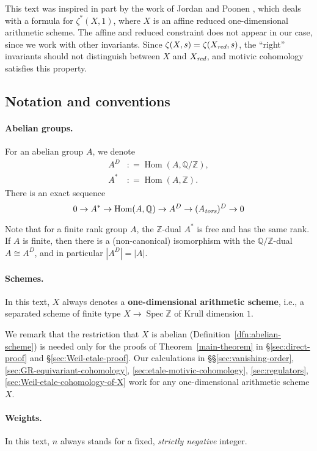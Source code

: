 \documentclass[draft]{article}
\DeclareMathOperator{\Hom}{Hom}
\DeclareMathOperator{\Spec}{Spec}
\newcommand{\QQ}{\mathbb{Q}}
\newcommand{\ZZ}{\mathbb{Z}}
\newcommand{\red}{\text{\it red}}
\newcommand{\tors}{\text{\it tors}}
\newcommand{\dfn}{\mathrel{\mathop:}=}
\theoremstyle{myplain}
\theoremstyle{mydefinition}
\begin{document}
This text was inspired in part by the work of Jordan and Poonen
\cite{Jordan-Poonen-2020}, which deals with a formula for $\zeta^* (X,1)$, where
$X$ is an affine reduced one-dimensional arithmetic scheme. The affine and
reduced constraint does not appear in our case, since we work with other
invariants. Since $\zeta (X,s) = \zeta (X_\red, s)$, the ``right'' invariants
should not distinguish between $X$ and $X_\red$, and motivic cohomology
satisfies this property.

\subsection*{Notation and conventions}

\paragraph{Abelian groups.}
For an abelian group $A$, we denote
\begin{align*}
  A^D & \dfn \Hom (A, \QQ/\ZZ), \\
  A^* & \dfn \Hom (A, \ZZ).
\end{align*}
There is an exact sequence
\begin{equation}
  \label{eqn:exact-sequence-A*-etc}
  0 \to A^* \to \Hom (A,\QQ) \to A^D \to (A_\tors)^D \to 0
\end{equation}

Note that for a finite rank group $A$, the $\ZZ$-dual $A^*$ is free and has the same
rank. If $A$ is finite, then there is a (non-canonical) isomorphism with the
$\QQ/\ZZ$-dual $A \cong A^D$, and in particular $|A^D| = |A|$.

\paragraph{Schemes.}
In this text, $X$ always denotes a \textbf{one-dimensional arithmetic scheme},
i.e., a separated scheme of finite type $X \to \Spec \ZZ$ of Krull dimension
$1$.

We remark that the restriction that $X$ is abelian
(Definition~\ref{dfn:abelian-scheme}) is needed only for the
proofs of Theorem~\ref{main-theorem} in \S\ref{sec:direct-proof} and
\S\ref{sec:Weil-etale-proof}. Our calculations in
\S\S\ref{sec:vanishing-order},
\ref{sec:GR-equivariant-cohomology},
\ref{sec:etale-motivic-cohomology},
\ref{sec:regulators},
\ref{sec:Weil-etale-cohomology-of-X}
work for any one-dimensional arithmetic scheme $X$.

\paragraph{Weights.}
In this text, $n$ always stands for a fixed, \emph{strictly negative} integer.
\end{document}
